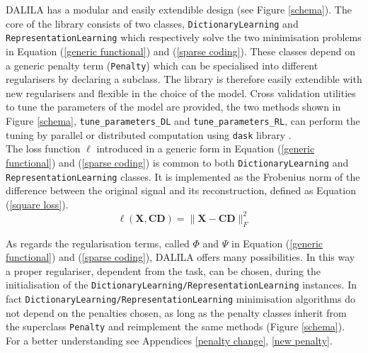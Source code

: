 DALILA has a modular and easily extendible design (see Figure \ref{schema}). The core of the library consists of two classes,  \texttt{DictionaryLearning} and \texttt{RepresentationLearning} which respectively solve the two minimisation problems in Equation (\ref{generic functional}) and (\ref{sparse coding}). These classes depend on a generic penalty term (\texttt{Penalty}) which can be specialised into different regularisers by declaring a subclass. The library is therefore easily extendible with new regularisers and flexible in the choice of the model.
Cross validation utilities to tune the parameters of the model are provided, the two methods shown in Figure \ref{schema}, \texttt{tune\_parameters\_DL} and \texttt{tune\_parameters\_RL}, can perform the tuning by parallel or distributed computation using \texttt{dask} library \cite{dask}.\\


The loss function $\ell$ introduced in a generic form in Equation (\ref{generic functional}) and (\ref{sparse coding}) is common to both \texttt{DictionaryLearning} and \texttt{RepresentationLearning} classes.
It is implemented as the Frobenius norm of the difference between the original signal and its reconstruction, defined as Equation (\ref{square loss}).
\begin{equation}\label{square loss}
\ell(\textbf{X}, \textbf{CD}) = \|\textbf{X} - \textbf{CD}\|_F^2
\end{equation}

As regards the regularisation terms, called $\Phi$ and $\Psi$ in Equation (\ref{generic functional}) and (\ref{sparse coding}),  DALILA
offers many possibilities.
In this way a proper regulariser, dependent from the task, can be chosen, during the initialisation of the \texttt{DictionaryLearning/RepresentationLearning} instances.
In fact \texttt{DictionaryLearning/RepresentationLearning} minimisation algorithms do not depend on the penalties chosen,
as long as the penalty classes inherit from the superclass \texttt{Penalty} and reimplement the same methods (Figure \ref{schema}).
For a better understanding see Appendices \ref{penalty change}, \ref{new penalty}.



